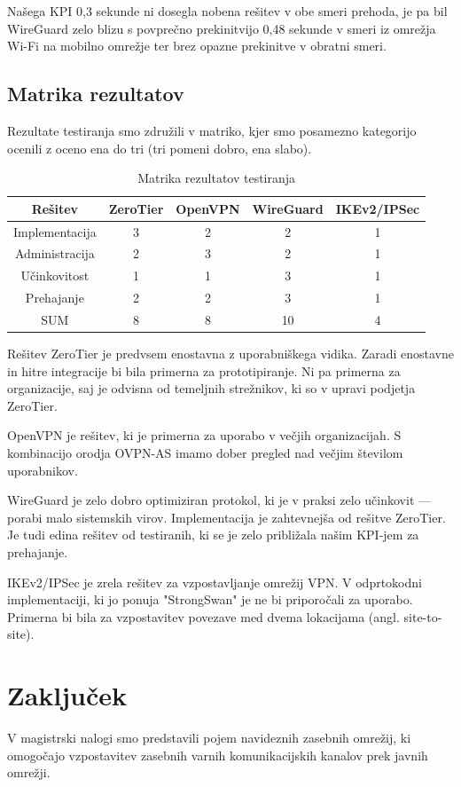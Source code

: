 \documentclass[a4paper, 12pt]{book}
\begin{document}
Našega KPI 0,3 sekunde ni dosegla nobena rešitev v obe smeri prehoda, je pa bil WireGuard zelo blizu s povprečno prekinitvijo 0,48 sekunde v smeri iz omrežja Wi-Fi na mobilno omrežje ter brez opazne prekinitve v obratni smeri.

\section{Matrika rezultatov}
\label{matrika_rezultatov}
Rezultate testiranja smo združili v matriko, kjer smo posamezno kategorijo ocenili z oceno ena do tri (tri pomeni dobro, ena slabo).
\begin{table}[h]
\begin{tabular}{ c || c | c | c | c }

 Rešitev&ZeroTier &OpenVPN &WireGuard  & IKEv2/IPSec\\ 
 \hline
 Implementacija & 3 & 2 & 2 & 1 \\  
 Administracija & 2 & 3 & 2 & 1 \\
 Učinkovitost & 1 & 1 & 3 & 1 \\
 Prehajanje & 2 & 2 & 3 & 1 \\
 \hline
 SUM &8&8&10&4
\end{tabular}
\caption{Matrika rezultatov testiranja}
\end{table}

Rešitev ZeroTier je predvsem enostavna z uporabniškega vidika. Zaradi enostavne in hitre integracije bi bila primerna za prototipiranje. Ni pa primerna za organizacije, saj je odvisna od temeljnih strežnikov, ki so v upravi podjetja ZeroTier.

OpenVPN je rešitev, ki je primerna za uporabo v večjih organizacijah. S kombinacijo orodja OVPN-AS imamo dober pregled nad večjim številom uporabnikov.

WireGuard je zelo dobro optimiziran protokol, ki je v praksi zelo učinkovit --- porabi malo sistemskih virov. Implementacija je zahtevnejša od rešitve ZeroTier. Je tudi edina rešitev od testiranih, ki se je zelo približala našim KPI-jem za prehajanje.

IKEv2/IPSec je zrela rešitev za vzpostavljanje omrežij VPN. V odprtokodni implementaciji, ki jo ponuja "StrongSwan" je ne bi priporočali za uporabo. Primerna bi bila za vzpostavitev povezave med dvema lokacijama (angl. site-to-site).

\chapter{Zaključek}
\label{zakljucek}
V magistrski nalogi smo predstavili pojem navideznih zasebnih omrežij, ki omogočajo vzpostavitev zasebnih varnih komunikacijskih kanalov prek javnih omrežji.
\end{document}

